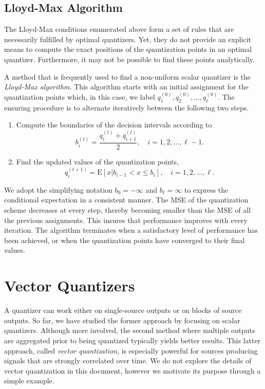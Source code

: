 \subsection{Lloyd-Max Algorithm}

The Lloyd-Max conditions enumerated above form a set of rules that are necessarily fulfilled by optimal quantizers.
Yet, they do not provide an explicit means to compute the exact positions of the quantization points in an optimal quantizer.
Furthermore, it may not be possible to find these points analytically.

A method that is frequently used to find a non-uniform scalar quantizer is the \emph{Lloyd-Max algorithm}.
This algorithm starts with an initial assignment for the quantization points which, in this case, we label $q_1^{(0)}, q_2^{(0)}, \ldots, q_{\ell}^{(0)}$.
The ensuring procedure is to alternate iteratively between the following two steps.
\begin{enumerate}
\item Compute the boundaries of the decision intervals according to
\begin{equation*}
b_i^{(t)} = \frac{q_i^{(t)} + q_{i+1}^{(t)}}{2} , \quad 
i = 1, 2, \ldots, \ell - 1 .
\end{equation*}
\item Find the updated values of the quantization points,
\begin{equation*}
q_i^{(t+1)} = \mathrm{E} [x | b_{i-1} < x \leq b_i ] , \quad
i = 1, 2, \ldots, \ell .
\end{equation*}
\end{enumerate}
We adopt the simplifying notation $b_0 = - \infty$ and $b_{\ell} = \infty$ to express the conditional expectation in a consistent manner.
The MSE of the quantization scheme decreases at every step, thereby becoming smaller than the MSE of all the previous assignments.
This insures that performance improves with every iteration.
The algorithm terminates when a satisfactory level of performance has been achieved, or when the quantization points have converged to their final values.


\section{Vector Quantizers}

A quantizer can work either on single-source outputs or on blocks of source outputs.
So far, we have studied the former approach by focusing on scalar quantizers.
Although more involved, the second method where multiple outputs are aggregated prior to being quantized typically yields better results.
This latter approach, called \emph{vector quantization}, is especially powerful for sources producing signals that are strongly correlated over time.
We do not explore the details of vector quantization in this document, however we motivate its purpose through a simple example.

